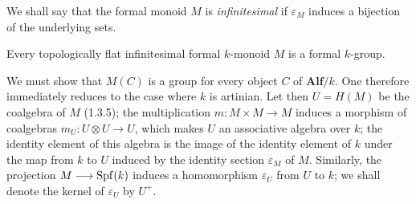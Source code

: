 We shall say that the formal monoid $M$ is \emph{infinitesimal} if $\varepsilon_M$ induces a bijection of the underlying sets.
\begin{proposition}{}
Every topologically flat infinitesimal formal $k$-monoid $M$ is a formal $k$-group.
\end{proposition}
We must show that $M(C)$ is a group for every object $C$ of $\mathbf{Alf}/k$. One therefore immediately reduces to the case where $k$ is artinian. Let then $U=H(M)$ be the coalgebra of $M$ (1.3.5); the multiplication $m:M\times M\to M$ induces a morphism of coalgebras $m_U:U\otimes U\to U$, which makes $U$ an associative algebra over $k$; the identity element of this algebra is the image of the identity element of $k$ under the map from $k$ to $U$ induced by the identity section $\varepsilon_M$ of $M$. Similarly, the projection $M\longrightarrow\operatorname{Spf}(k)$ induces a homomorphism $\varepsilon_U$ from $U$ to $k$; we shall denote the kernel of $\varepsilon_U$ by $U^+$.

